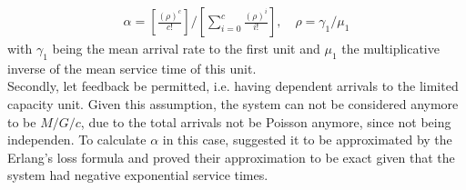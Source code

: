 \documentclass[11pt,a4paper]{article}
\begin{document}
\begin{spacing}{1.8}
\begin{align} \alpha = \left[\frac{( \rho) ^{c}}{c!}\right] \bigg/ \left[\sum_{i=0}^{c} \frac{( \rho) ^{i}}{i!}\right], \quad \rho = \gamma_1 / \mu_1 \end{align}
with \(\gamma_1\) being the mean arrival rate to the first unit and \( \mu_1 \) the multiplicative inverse of the mean service time of this unit. \\ Secondly, let feedback be permitted, i.e. having dependent arrivals to the limited capacity unit. Given this assumption, the system can not be considered anymore to be \(M/G/c\), due to the total arrivals not be Poisson anymore, since not being independen.
To calculate \(\alpha\) in this case,  \citet{Hershey1981} suggested it to be approximated by the Erlang's loss formula and proved their approximation to be exact given that the system had negative exponential service times. 

\\


\end{spacing}
\end{document}
